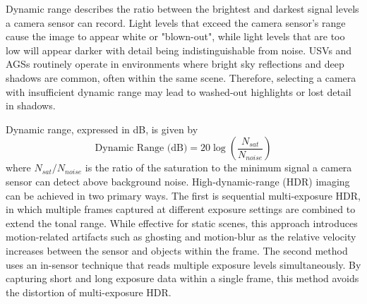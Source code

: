 \documentclass{erauthesis}
\begin{document}



Dynamic range describes the ratio between the brightest and darkest signal levels a camera sensor can record.
Light levels that exceed the camera sensor's range cause the image to appear white or "blown-out", while light levels that are too low will appear darker with detail being indistinguishable from noise.
\acp{USV} and \acp{AGS} routinely operate in environments where bright sky reflections and deep shadows are common, often within the same scene.
Therefore, selecting a camera with insufficient dynamic range may lead to washed-out highlights or lost detail in shadows.

Dynamic range, expressed in dB, is given by
\begin{equation}
 \text{Dynamic Range (dB)} = 20 \log{\left( \frac{N_{sat}}{N_{noise}}\right) }
\end{equation}
where $N_{sat}/N_{noise}$ is the ratio of the saturation to the minimum signal a camera sensor can detect above background noise.
High-dynamic-range (HDR) imaging can be achieved in two primary ways. 
The first is sequential multi-exposure \ac{HDR}, in which multiple frames captured at different exposure settings are combined to extend the tonal range. 
While effective for static scenes, this approach introduces motion-related artifacts such as ghosting and motion-blur as the relative velocity increases between the sensor and objects within the frame.
The second method uses an in-sensor technique that reads multiple exposure levels simultaneously. 
By capturing short and long exposure data within a single frame, this method avoids the distortion of multi-exposure \ac{HDR}.
\end{document}
